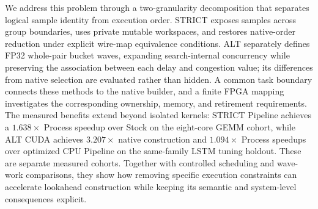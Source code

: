 We address this problem through a two-granularity decomposition that separates logical sample identity from execution order. STRICT exposes samples across group boundaries, uses private mutable workspaces, and restores native-order reduction under explicit wire-map equivalence conditions. ALT separately defines FP32 whole-pair bucket waves, expanding search-internal concurrency while preserving the association between each delay and congestion value; its differences from native selection are evaluated rather than hidden. A common task boundary connects these methods to the native builder, and a finite FPGA mapping investigates the corresponding ownership, memory, and retirement requirements. The measured benefits extend beyond isolated kernels: STRICT Pipeline achieves a $1.638\times$ Process speedup over Stock on the eight-core GEMM cohort, while ALT CUDA achieves $3.207\times$ native construction and $1.094\times$ Process speedups over optimized CPU Pipeline on the same-family LSTM tuning holdout. These are separate measured cohorts. Together with controlled scheduling and wave-work comparisons, they show how removing specific execution constraints can accelerate lookahead construction while keeping its semantic and system-level consequences explicit.
